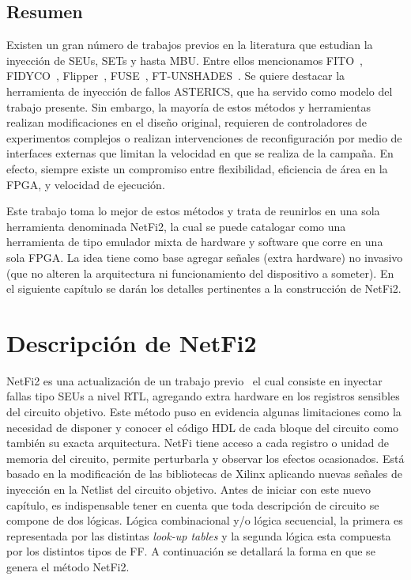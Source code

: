 \documentclass[a4paper,openright,12pt]{report}
\begin{document}
\section{ Resumen}

Existen un gran número de trabajos previos en la literatura que estudian la inyección de SEUs, SETs y hasta MBU. Entre ellos mencionamos FITO~\cite{Shokrolah2008}, FIDYCO~\cite{Rahbaran2004}, Flipper~\cite{Alderighi2010}, FUSE~\cite{Jeitler2009}, FT-UNSHADES~\cite{Guzman2008}. Se quiere destacar la herramienta de inyección de fallos ASTERICS, que ha servido como modelo del trabajo presente. Sin embargo, la mayoría de estos métodos y herramientas realizan modificaciones en el diseño original, requieren de controladores de experimentos complejos o realizan  intervenciones de reconfiguración por medio de interfaces externas que limitan la velocidad en que se realiza de la campaña. En efecto, siempre existe un compromiso entre flexibilidad, eficiencia de área en la FPGA, y velocidad de ejecución.

Este trabajo toma lo mejor de estos métodos y trata de reunirlos en una sola herramienta denominada NetFi2, la cual se puede catalogar como una herramienta de tipo emulador mixta de hardware y software que corre en una sola FPGA. La idea tiene como base agregar señales (extra hardware) no invasivo (que no alteren la arquitectura ni funcionamiento del dispositivo a someter).
En el siguiente capítulo se darán los detalles pertinentes a la construcción de NetFi2.


\chapter{Descripción de NetFi2}



NetFi2 es una actualización de un trabajo previo~\cite{6555963}  el cual consiste  en inyectar fallas tipo SEUs a nivel RTL, agregando extra hardware en los registros sensibles del circuito objetivo. Este método puso en evidencia algunas limitaciones como la necesidad de disponer y conocer el código HDL de cada bloque del circuito como también su exacta arquitectura.
NetFi tiene acceso a cada registro o unidad de memoria del circuito, permite  perturbarla y observar los efectos ocasionados. Está basado en la modificación de las bibliotecas de Xilinx aplicando  nuevas señales de inyección en la Netlist del circuito objetivo.
Antes de iniciar con este nuevo capítulo, es indispensable tener en cuenta que toda descripción de circuito se compone de dos lógicas. Lógica combinacional y/o lógica secuencial, la primera es representada por las distintas \textit{look-up tables} y la segunda lógica esta compuesta por los distintos tipos de FF. A continuación se detallará la forma en que se genera el método NetFi2.
\end{document}

